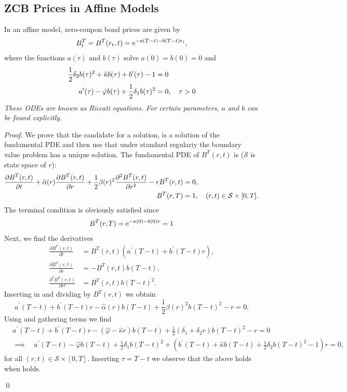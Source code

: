 \subsection{ZCB Prices in Affine Models}
\begin{theorem*}
In an affine model, zero-coupon bond prices are given by
\[
B_{t}^{T}=B^{T}(r_t, t)=\mathrm{e}^{-a(T-t)-b(T-t) r_t}
,\]
where the functions $a(\tau)$ and $b(\tau)$ solve $a(0)=b(0)=0$ and
\begin{align}
\frac{1}{2} \delta_{2} b(\tau)^{2}+\hat{\kappa} b(\tau)+b^{\prime}(\tau)-1 & =0  
\label{eq:02-ricatti}
\\
a^{\prime}(\tau)-\hat{\varphi} b(\tau)+\frac{1}{2} \delta_{1} b(\tau)^{2} & =0, \quad \tau>0
\notag
\end{align}
\emph{These ODEs are known as Riccati equations. For certain parameters, $a$ and $b$ can be found
explicitly.}
\end{theorem*}
\begin{proof}
 We prove that the candidate for a solution, is a solution of the fundamental PDE and then use that
 under standard regulariy the boundary value problem has a unique solution. 
 The fundamental PDE of $B^{T}(r, t)$ is ($\mathcal{S}$ is state space of $r$):
\begin{align}
\frac{\partial B^{T}(r, t)}{\partial t}
+\hat{\alpha}(r) \frac{\partial B^{T}(r, t)}{\partial r}
+\frac{1}{2} \beta(r)^{2} \frac{\partial^{2} B^{T}(r, t)}{\partial r^{2}}-r B^{T}(r, t) & =0,  
\label{eq:02-fundamental-pde}
\\
B^{T}(r, T) & =1, \quad(r, t) \in \mathcal{S} \times[0, T] \notag
.\end{align}
The terminal condition is obviously satisfied since
\[
B^{T}(r, T)=\mathrm{e}^{-a(0)-b(0) r}=1
\]
Next, we find the derivatives
\begin{align*}
\frac{\partial B^{T}(r, t)}{\partial t} & =B^{T}(r, t)\left(a^{\prime}(T-t)+b^{\prime}(T-t) r\right), \\
\frac{\partial B^{T}(r, t)}{\partial r} & =-B^{T}(r, t) b(T-t), \\
\frac{\partial^{2} B^{T}(r, t)}{\partial r^{2}} & =B^{T}(r, t) b(T-t)^{2} .
\end{align*}
Inserting in  and dividing by $B^{T}(r, t)$ we obtain
\[
a^{\prime}(T-t)+b^{\prime}(T-t) r-\hat{\alpha}(r) b(T-t)+\frac{1}{2} \beta(r)^{2} b(T-t)^{2}-r=0 .
\]
Using  and gathering terms we find
\begin{align*}
& a^{\prime}(T-t)+b^{\prime}(T-t) r-(\hat{\varphi}-\hat{\kappa} r) b(T-t)
+\frac{1}{2}\left(\delta_{1}+\delta_{2} r\right) b(T-t)^{2}-r=0 \\
& \implies \quad  
a^{\prime}(T-t)-\hat{\varphi} b(T-t)+\frac{1}{2} \delta_{1} b(T-t)^{2}
+\left(b^{\prime}(T-t)+\hat{\kappa} b(T-t)+\frac{1}{2} \delta_{2} b(T-t)^{2}-1\right)
r=0,
\end{align*}
for all $(r, t) \in \mathcal{S} \times[0, T]$.
Inserting $\tau=T-t$ we observe that the above holds when  holds.

\qed
\end{proof}

